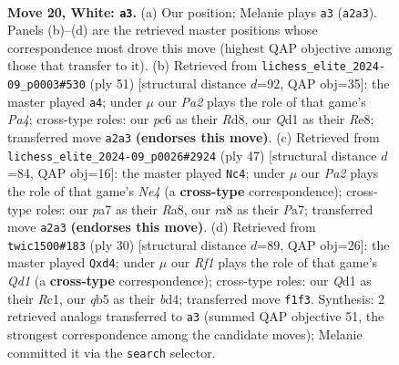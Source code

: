 \documentclass[11pt]{article}
\begin{document}
\clearpage

\begin{figure}[p]\centering
\begin{subfigure}{0.46\textwidth}\centering
\resizebox{\linewidth}{!}{%
\newchessgame
\chessboard[
  setfen={r6r/p2nk2p/2pbp1p1/1q1n2P1/Np1P3N/4P2P/PP6/R1BQ1RK1 w - - 0 20},
  showmover=false,
  pgfstyle=straightmove, color=movearrow, markmove={a2-a3}
]}
\caption{}
\end{subfigure}\hfill
\begin{subfigure}{0.46\textwidth}\centering
\resizebox{\linewidth}{!}{%
\newchessgame
\chessboard[
  setfen={3rr1k1/1pq3p1/1n2pb1p/p1n1Np1P/2P5/1P2QP1R/PB2N1P1/4RK2 b - - 1 26},
  showmover=false,
  pgfstyle=straightmove, color=movearrow, markmove={a5-a4}
]}
\caption{}
\end{subfigure}
\\[4pt]
\begin{subfigure}{0.46\textwidth}\centering
\resizebox{\linewidth}{!}{%
\newchessgame
\chessboard[
  setfen={r3q3/p4r1k/bp3b2/1p2nNpp/1B2Pp2/1Q3P1P/2P1N1P1/3R1RK1 b - - 3 24},
  showmover=false,
  pgfstyle=straightmove, color=movearrow, markmove={e5-c4}
]}
\caption{}
\end{subfigure}\hfill
\begin{subfigure}{0.46\textwidth}\centering
\resizebox{\linewidth}{!}{%
\newchessgame
\chessboard[
  setfen={rnq2rk1/ppp1pp1p/1n4p1/2NP4/3bPP2/5P2/PP5P/2RQKB1R w K - 0 16},
  showmover=false,
  pgfstyle=straightmove, color=movearrow, markmove={d1-d4}
]}
\caption{}
\end{subfigure}
\caption{\textbf{Move 20, White: \texttt{a3}.} (a) Our position; Melanie plays \texttt{a3} (\texttt{a2a3}). Panels (b)--(d) are the retrieved master positions whose correspondence most drove this move (highest QAP objective among those that transfer to it). (b) Retrieved from \texttt{lichess\_elite\_2024-09\_p0003\#530} (ply 51) [structural distance $d$=92, QAP obj=35]: the master played \texttt{a4}; under $\mu$ our \emph{Pa2} plays the role of that game's \emph{Pa4}; cross-type roles: our \emph{p}c6 as their \emph{R}d8, our \emph{Q}d1 as their \emph{R}e8; transferred move \texttt{a2a3} \textbf{(endorses this move)}. (c) Retrieved from \texttt{lichess\_elite\_2024-09\_p0026\#2924} (ply 47) [structural distance $d$=84, QAP obj=16]: the master played \texttt{Nc4}; under $\mu$ our \emph{Pa2} plays the role of that game's \emph{Ne4} (a \textbf{cross-type} correspondence); cross-type roles: our \emph{p}a7 as their \emph{R}a8, our \emph{r}a8 as their \emph{P}a7; transferred move \texttt{a2a3} \textbf{(endorses this move)}. (d) Retrieved from \texttt{twic1500\#183} (ply 30) [structural distance $d$=89, QAP obj=26]: the master played \texttt{Qxd4}; under $\mu$ our \emph{Rf1} plays the role of that game's \emph{Qd1} (a \textbf{cross-type} correspondence); cross-type roles: our \emph{Q}d1 as their \emph{R}c1, our \emph{q}b5 as their \emph{b}d4; transferred move \texttt{f1f3}. Synthesis: 2 retrieved analogs transferred to \texttt{a3} (summed QAP objective 51, the strongest correspondence among the candidate moves); Melanie committed it via the \texttt{search} selector.}
\label{fig:thought-m38}
\end{figure}
\end{document}
